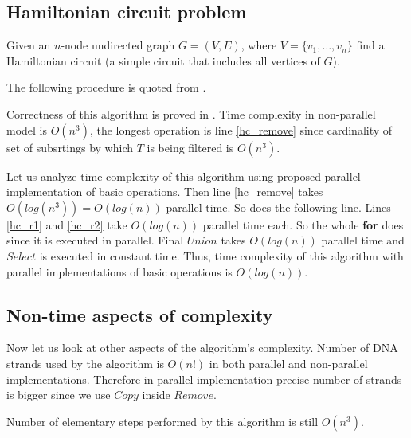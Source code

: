 \subsection{Hamiltonian circuit problem}

Given an $n$-node undirected graph $G = (V, E)$, where $V=\{v_1, \dots, v_n\}$ find a Hamiltonian circuit (a simple circuit that includes all vertices of $G$).

The following procedure is quoted from \cite{Katsanyi:2003}.


Correctness of this algorithm is proved in \cite{Katsanyi:2003}. Time complexity in non-parallel model is $O(n^3)$, the longest operation is line \ref{hc_remove} since cardinality of set of subsrtings by which $T$ is being filtered is $O(n^3)$.

Let us analyze time complexity of this algorithm using proposed parallel implementation of basic operations. Then line \ref{hc_remove} takes $O(log(n^3))=O(log(n))$ parallel time. So does the following line. Lines \ref{hc_r1} and \ref{hc_r2} take $O(log(n))$ parallel time each. So the whole {\bf for} does since it is executed in parallel. Final $Union$ takes $O(log(n))$ parallel time and $Select$ is executed in constant time. Thus, time complexity of this algorithm with parallel implementations of basic operations is $O(log(n))$.

\subsection{Non-time aspects of complexity}
Now let us look at other aspects of the algorithm's complexity. Number of DNA strands used by the algorithm is $O(n!)$ in both parallel and non-parallel implementations. Therefore in parallel implementation precise number of strands is bigger since we use $Copy$ inside $Remove$.

Number of elementary steps performed by this algorithm is still $O(n^3)$.

